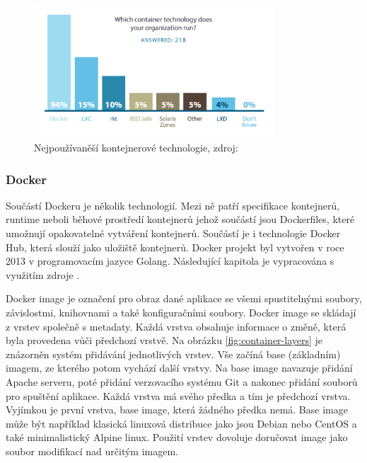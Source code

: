 \begin{figure}[H]
  \begin{centering}
    \includegraphics[width=0.8\textwidth]{images/docker.png}
    \par
	  \caption{Nejpoužívaněší kontejnerové technologie\label{fig:container}, zdroj: }
    \end{centering}
\end{figure}

\subsubsection{Docker}
Součástí Dockeru je několik technologií. Mezi ně patří specifikace kontejnerů, runtime neboli běhové prostředí kontejnerů jehož součástí jsou Dockerfiles, které umožnují opakovatelné vytváření kontejnerů. Součástí je i technologie Docker Hub, která slouží jako uložiště kontejnerů. Docker projekt byl vytvořen v roce 2013 v programovacím jazyce Golang. Následující kapitola je vypracována s využitím zdroje \cite{docker-security}.\par
Docker image je označení pro obraz dané aplikace se všemi spustitelnými soubory, závislostmi, knihovnami a také konfiguračními soubory. Docker image se skládají \linebreak z vrstev společně s metadaty. Každá vrstva obsahuje informace o změně, která byla provedena vůči předchozí vrstvě. Na obrázku \ref{fig:container-layers} je znázorněn systém přidávání jednotlivých vrstev. Vše začíná base (základním) imagem, ze kterého potom vychází další vrstvy. Na base image navazuje přidání Apache serveru, poté přidání verzovacího systému Git a nakonec přidání souborů pro spuštění aplikace. Každá vrstva má svého předka a tím je předchozí vrstva. Vyjímkou je první vrstva, base image, která žádného předka nemá. Base image může být například klasická linuxová distribuce jako jsou Debian nebo CentOS a také minimalistický Alpine linux. Použití vrstev dovoluje doručovat image jako soubor modifikací nad určitým imagem. \par

